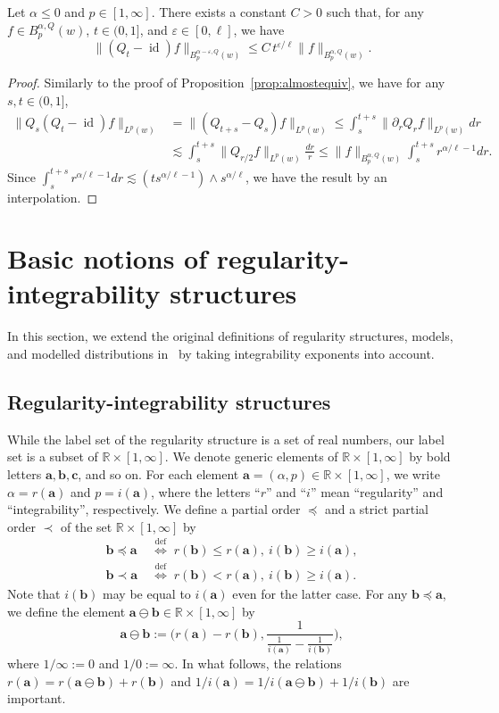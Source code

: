 \documentclass[AHL,Unicode,longabstracts,published]{cedram}
\newcommand{\bbR}{\mathbb{R}}
\newcommand{\bfa}{\mathbf{a}}
\newcommand{\bfb}{\mathbf{b}}
\newcommand{\bfc}{\mathbf{c}}
\newcommand{\bfaob}{\mathbf{a}\ominus\mathbf{b}}
\DeclareMathOperator{\id}{id}
\DeclareMathOperator{\deff}{def}
\begin{document}
\begin{lemm}\label{lem:timecontinuity}
Let $\alpha\le0$ and $p\in[1,\infty]$. There exists a constant $C>0$ such that, for any $f\in B_p^{\alpha,Q}(w)$, $t\in(0,1]$, and $\varepsilon\in[0,\ell]$, we have
\[
\|(Q_t-\id)f\|_{B_p^{\alpha-\varepsilon,Q}(w)}
\le C\, t^{\varepsilon/\ell}\|f\|_{B_p^{\alpha,Q}(w)}.
\]
\end{lemm}

\begin{proof}
Similarly to the proof of Proposition~\ref{prop:almostequiv}, we have for any $s,t\in(0,1]$,
\begin{align*}
\|Q_s(Q_t-\id)f\|_{L^p(w)} &=\|(Q_{t+s}-Q_s)f\|_{L^p(w)}\le\int_s^{t+s}\|\partial_rQ_rf\|_{L^p(w)}dr\\
&\lesssim\int_s^{t+s}\|Q_{r/2}f\|_{L^p(w)}\frac{dr}r
\le\|f\|_{B_p^{\alpha,Q}(w)}\int_s^{t+s}r^{\alpha/\ell-1}dr.
\end{align*}
Since $\int_s^{t+s}r^{\alpha/\ell-1}dr\lesssim (ts^{\alpha/\ell-1})\wedge s^{\alpha/\ell}$, we have the result by an interpolation.
\end{proof}

\section{Basic notions of regularity-integrability structures}\label{section:RI}

In this section, we extend the original definitions of regularity structures, models, and modelled distributions in~\cite{Hai14} by taking integrability exponents into account.

\subsection{Regularity-integrability structures}

While the label set of the regularity structure is a set of real numbers, our label set is a subset of $\bbR\times[1,\infty]$. We denote generic elements of $\bbR\times[1,\infty]$ by bold letters $\bfa,\bfb,\bfc$, and so on. For each element $\bfa=(\alpha,p)\in\bbR\times[1,\infty]$, we write $\alpha=r(\bfa)$ and $p=i(\bfa)$, where the letters ``$r$'' and ``$i$'' mean ``regularity'' and ``integrability'', respectively. We define a partial order $\preceq$ and a strict partial order $\prec$ of the set $\bbR\times[1,\infty]$ by
\begin{align*}
\bfb\preceq\bfa&\;\overset{\deff}
{\Longleftrightarrow}\; r(\bfb)\le r(\bfa),\ i(\bfb)\ge i(\bfa),\\
\bfb\prec\bfa&\;\overset{\deff}{\Longleftrightarrow}\; r(\bfb)<r(\bfa),\ i(\bfb)\ge i(\bfa).
\end{align*}
Note that $i(\bfb)$ may be equal to $i(\bfa)$ even for the latter case. For any $\bfb\preceq\bfa$, we define the element $\bfaob\in\bbR\times[1,\infty]$ by
\[
\bfaob:=\Bigg(r(\bfa)-r(\bfb),\frac1{\frac1{i(\bfa)}-\frac1{i(\bfb)}}\Bigg),
\]
where $1/\infty:=0$ and $1/0:=\infty$. In what follows, the relations $r(\bfa)=r(\bfa\ominus\bfb)+r(\bfb)$ and $1/{i(\bfa)}=1/{i(\bfaob)}+1/{i(\bfb)}$ are important.
\end{document}
